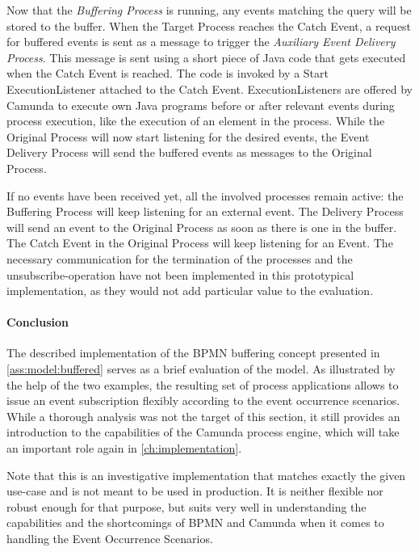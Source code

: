 Now that the \textit{Buffering Process} is running, any events matching the query will be stored to the buffer.
When the Target Process reaches the Catch Event, a request for buffered events is sent as a message to trigger the \textit{Auxiliary Event Delivery Process}.
This message is sent using a short piece of Java code that gets executed when the Catch Event is reached. 
The code is invoked by a Start ExecutionListener attached to the Catch Event. ExecutionListeners are offered by Camunda to execute own Java programs before or after relevant events during process execution, like the execution of an element in the process.
While the Original Process will now start listening for the desired events, the Event Delivery Process will send the buffered events as messages to the Original Process.

If no events have been received yet, all the involved processes remain active: the Buffering Process will keep listening for an external event. The Delivery Process will send an event to the Original Process as soon as there is one in the buffer. The Catch Event in the Original Process will keep listening for an Event.
The necessary communication for the termination of the processes and the unsubscribe-operation have not been implemented in this prototypical implementation, as they would not add particular value to the evaluation.



\paragraph{Conclusion}
The described implementation of the BPMN buffering concept presented in \autoref{ass:model:buffered} serves as a brief evaluation of the model. As illustrated by the help of the two examples, the resulting set of process applications allows to issue an event subscription flexibly according to the event occurrence scenarios.
While a thorough analysis was not the target of this section, it still provides an introduction to the capabilities of the Camunda process engine, which will take an important role again in \ref{ch:implementation}.


Note that this is an investigative implementation that matches exactly the given use-case and is not meant to be used in production. It is neither flexible nor robust enough for that purpose, but suits very well in understanding the capabilities and the shortcomings of BPMN and Camunda when it comes to handling the Event Occurrence Scenarios.

